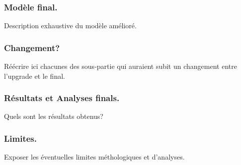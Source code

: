 \documentclass[onecolumn, 12pt]{article}
\begin{document}
\subsubsection{Modèle final.}
Description exhaustive du modèle amélioré.
\subsubsection{Changement?}
Réécrire ici chacunes des sous-partie qui auraient subit un changement entre
l'upgrade et le final.
  \subsubsection{Résultats et Analyses finals.}
  Quels sont les résultats obtenus?
  \subsubsection{Limites.}
  Exposer les éventuelles limites méthologiques et d'analyses.
\end{document}
